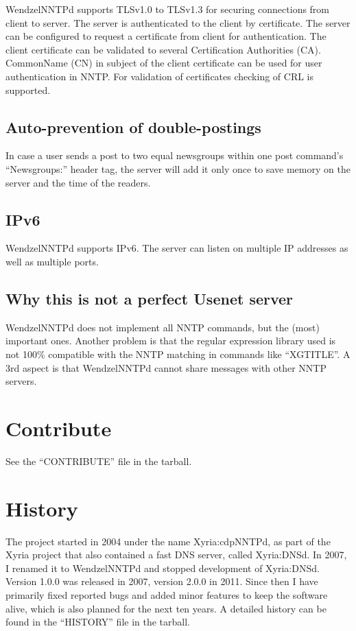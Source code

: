 WendzelNNTPd supports TLSv1.0 to TLSv1.3 for securing connections from client to server. The server is authenticated to the client by certificate. The server can be configured to request a certificate from client for authentication. The client certificate can be validated to several Certification Authorities (CA). CommonName (CN) in subject of the client certificate can be used for user authentication in NNTP. For validation of certificates checking of CRL is supported.

\subsection{Auto-prevention of double-postings}

In case a user sends a post to two equal newsgroups within one post command's ``Newsgroups:'' header tag, the server will add it only once to save memory on the server and the time of the readers.

\subsection{IPv6}

WendzelNNTPd supports IPv6. The server can listen on multiple IP addresses as well as multiple ports.

\subsection{Why this is not a perfect Usenet server}

WendzelNNTPd does not implement all NNTP commands, but the (most) important ones. Another problem is that the regular expression library used is not 100\% compatible with the NNTP matching in commands like ``XGTITLE''. A 3rd aspect is that WendzelNNTPd cannot share messages with other NNTP servers.

\section{Contribute}

See the ``CONTRIBUTE'' file in the tarball.

\section{History}

The project started in 2004 under the name Xyria:cdpNNTPd, as part of the Xyria project that also contained a fast DNS server, called Xyria:DNSd. In 2007, I renamed it to WendzelNNTPd and stopped development of Xyria:DNSd. Version 1.0.0 was released in 2007, version 2.0.0 in 2011. Since then I have primarily fixed reported bugs and added minor features to keep the software alive, which is also planned for the next ten years. A detailed history can be found in the ``HISTORY'' file in the tarball.





